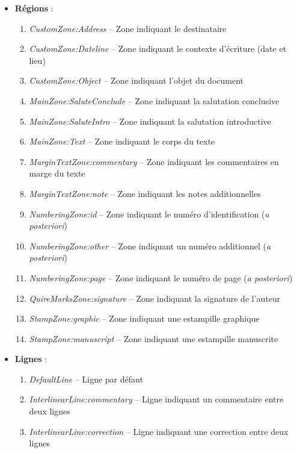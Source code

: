 	\begin{itemize}
	    \item \textbf{Régions} :
	    \begin{enumerate}
	        \item \textit{CustomZone:Address} -- Zone indiquant le destinataire
	        \item \textit{CustomZone:Dateline} -- Zone indiquant le contexte d'écriture (date et lieu)
	        \item \textit{CustomZone:Object} -- Zone indiquant l'objet du document
	        \item \textit{MainZone:SaluteConclude} -- Zone indiquant la salutation conclusive
	        \item \textit{MainZone:SaluteIntro} -- Zone indiquant la salutation introductive
	        \item \textit{MainZone:Text} -- Zone indiquant le corps du texte
	        \item \textit{MarginTextZone:commentary} -- Zone indiquant les commentaires en marge du texte
	        \item \textit{MarginTextZone:note} -- Zone indiquant les notes additionnelles
	        \item \textit{NumberingZone:id} -- Zone indiquant le numéro d'identification (\textit{a posteriori})
	        \item \textit{NumberingZone:other} -- Zone indiquant un numéro additionnel (\textit{a posteriori})
	        \item \textit{NumberingZone:page} -- Zone indiquant le numéro de page (\textit{a posteriori})
            \item \textit{QuireMarksZone:signature} -- Zone indiquant la signature de l'auteur
            \item \textit{StampZone:graphic} -- Zone indiquant une estampille graphique
            \item \textit{StampZone:manuscript} -- Zone indiquant une estampille manuscrite
	    \end{enumerate}
	    \item \textbf{Lignes} :
	    \begin{enumerate}
	        \item \textit{DefaultLine} -- Ligne par défaut
	        \item \textit{InterlinearLine:commentary} -- Ligne indiquant un commentaire entre deux lignes
	        \item \textit{InterlinearLine:correction} -- Ligne indiquant une correction entre deux lignes\newpar
	    \end{enumerate}
	\end{itemize}
	
